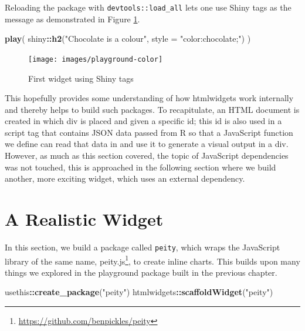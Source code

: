 \documentclass[10pt,]{krantz}
\makeatletter
\newenvironment{Shaded}{\begin{snugshade}}{\end{snugshade}}
\newcommand{\DataTypeTok}[1]{\textcolor[rgb]{0.27,0.27,0.27}{#1}}
\newcommand{\KeywordTok}[1]{\textcolor[rgb]{0.27,0.27,0.27}{\textbf{#1}}}
\newcommand{\NormalTok}[1]{#1}
\newcommand{\OperatorTok}[1]{\textcolor[rgb]{0.43,0.43,0.43}{\textbf{#1}}}
\newcommand{\StringTok}[1]{\textcolor[rgb]{0.5,0.5,0.5}{#1}}
\renewcommand{\href}[2]{#2\footnote{\url{#1}}}
\newenvironment{kframe}{%
\medskip{}
\setlength{\fboxsep}{.8em}
 \def\at@end@of@kframe{}%
 \ifinner\ifhmode%
  \def\at@end@of@kframe{\end{minipage}}%
  \begin{minipage}{\columnwidth}%
 \fi\fi%
 \def\FrameCommand##1{\hskip\@totalleftmargin \hskip-\fboxsep
 \colorbox{shadecolor}{##1}\hskip-\fboxsep
     \hskip-\linewidth \hskip-\@totalleftmargin \hskip\columnwidth}%
 \MakeFramed {\advance\hsize-\width
   \@totalleftmargin\z@ \linewidth\hsize
   \@setminipage}}%
 {\par\unskip\endMakeFramed%
 \at@end@of@kframe}
\renewenvironment{Shaded}{\begin{kframe}}{\end{kframe}}
\makeatother
\begin{document}
Reloading the package with \texttt{devtools::load\_all} lets one use Shiny tags as the message as demonstrated in Figure \ref{fig:playground-tags}.

\begin{Shaded}
\begin{Highlighting}[]
\KeywordTok{play}\NormalTok{(}
\NormalTok{  shiny}\OperatorTok{::}\KeywordTok{h2}\NormalTok{(}\StringTok{"Chocolate is a colour"}\NormalTok{, }\DataTypeTok{style =} \StringTok{"color:chocolate;"}\NormalTok{)}
\NormalTok{)}
\end{Highlighting}
\end{Shaded}

\begin{figure}[H]

{\centering \texttt{[image: images/playground-color]} 

}

\caption{First widget using Shiny tags}\label{fig:playground-tags}
\end{figure}

This hopefully provides some understanding of how htmlwidgets work internally and thereby helps to build such packages. To recapitulate, an HTML document is created in which div is placed and given a specific id; this id is also used in a script tag that contains JSON data passed from R so that a JavaScript function we define can read that data in and use it to generate a visual output in a div. However, as much as this section covered, the topic of JavaScript dependencies was not touched, this is approached in the following section where we build another, more exciting widget, which uses an external dependency.

\hypertarget{widgets-realistic}{%
\chapter{A Realistic Widget}\label{widgets-realistic}}

In this section, we build a package called \texttt{peity}, which wraps the JavaScript library of the same name, \href{https://github.com/benpickles/peity}{peity.js}, to create inline charts. This builds upon many things we explored in the playground package built in the previous chapter.

\begin{Shaded}
\begin{Highlighting}[]
\NormalTok{usethis}\OperatorTok{::}\KeywordTok{create_package}\NormalTok{(}\StringTok{"peity"}\NormalTok{)}
\NormalTok{htmlwidgets}\OperatorTok{::}\KeywordTok{scaffoldWidget}\NormalTok{(}\StringTok{"peity"}\NormalTok{)}
\end{Highlighting}
\end{Shaded}
\end{document}
